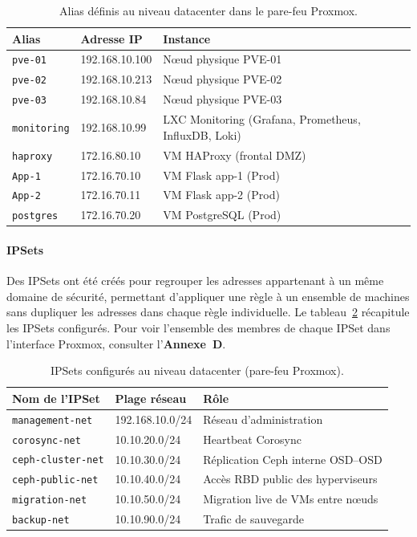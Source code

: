 \begin{table}[H]
\centering
\caption{Alias définis au niveau datacenter dans le pare-feu Proxmox.}
\label{tab:fw-datacenter-aliases}
\begin{tabular}{|l|l|l|}
\hline
\textbf{Alias} & \textbf{Adresse IP} & \textbf{Instance} \\
\hline
\texttt{pve-01}    & 192.168.10.100 & Nœud physique PVE-01 \\
\hline
\texttt{pve-02}    & 192.168.10.213 & Nœud physique PVE-02 \\
\hline
\texttt{pve-03}    & 192.168.10.84  & Nœud physique PVE-03 \\
\hline
\texttt{monitoring} & 192.168.10.99 & LXC Monitoring (Grafana, Prometheus, InfluxDB, Loki) \\
\hline
\texttt{haproxy}   & 172.16.80.10   & VM HAProxy (frontal DMZ) \\
\hline
\texttt{App-1} & 172.16.70.10   & VM Flask app-1 (Prod) \\
\hline
\texttt{App-2} & 172.16.70.11   & VM Flask app-2 (Prod) \\
\hline
\texttt{postgres}  & 172.16.70.20   & VM PostgreSQL (Prod) \\
\hline
\end{tabular}
\end{table}

\paragraph{IPSets}

\par Des IPSets ont été créés pour regrouper les adresses appartenant à un
même domaine de sécurité, permettant d'appliquer une règle à un ensemble de
machines sans dupliquer les adresses dans chaque règle individuelle. Le
tableau~\ref{tab:fw-datacenter-ipsets} récapitule les IPSets configurés.
Pour voir l'ensemble des membres de chaque IPSet dans l'interface Proxmox,
consulter l'\textbf{Annexe~D}.

\begin{table}[H]
\centering
\caption{IPSets configurés au niveau datacenter (pare-feu Proxmox).}
\label{tab:fw-datacenter-ipsets}
\begin{tabular}{|l|l|p{6.5cm}|}
\hline
\textbf{Nom de l'IPSet} & \textbf{Plage réseau} & \textbf{Rôle} \\
\hline
\texttt{management-net}   & 192.168.10.0/24 & Réseau d'administration  \\
\hline
\texttt{corosync-net}     & 10.10.20.0/24   & Heartbeat Corosync  \\
\hline
\texttt{ceph-cluster-net} & 10.10.30.0/24   & Réplication Ceph interne OSD--OSD \\
\hline
\texttt{ceph-public-net}  & 10.10.40.0/24   & Accès RBD public des hyperviseurs \\
\hline
\texttt{migration-net}    & 10.10.50.0/24   & Migration live de VMs entre nœuds \\
\hline
\texttt{backup-net}       & 10.10.90.0/24   & Trafic de sauvegarde  \\
\hline
\end{tabular}
\end{table}

